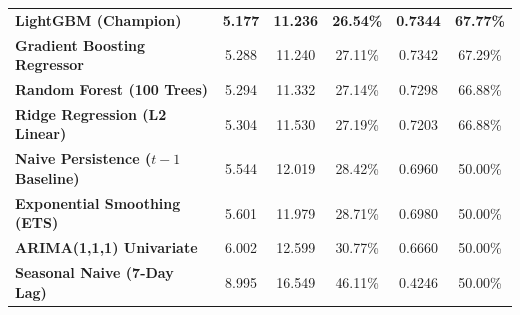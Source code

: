 \documentclass[aspectratio=169, 10pt]{beamer}
\begin{document}
\begin{frame}[t]
\begin{table}[h]
\begin{tabular}{lccccc}
                \textbf{LightGBM (Champion)} & \textbf{5.177} & \textbf{11.236} & \textbf{26.54\%} & \textbf{0.7344} & \textbf{67.77\%} \\                                                             
                \textbf{Gradient Boosting Regressor} & 5.288 & 11.240 & 27.11\% & 0.7342 & 67.29\% \\                                                                                                  
                \textbf{Random Forest (100 Trees)} & 5.294 & 11.332 & 27.14\% & 0.7298 & 66.88\% \\                                                                                                    
                \textbf{Ridge Regression (L2 Linear)} & 5.304 & 11.530 & 27.19\% & 0.7203 & 66.88\% \\                                                                                                 
                \textbf{Naive Persistence ($t-1$ Baseline)} & 5.544 & 12.019 & 28.42\% & 0.6960 & 50.00\% \\                                                                                           
                \textbf{Exponential Smoothing (ETS)} & 5.601 & 11.979 & 28.71\% & 0.6980 & 50.00\% \\                                                                                                  
                \textbf{ARIMA(1,1,1) Univariate} & 6.002 & 12.599 & 30.77\% & 0.6660 & 50.00\% \\                                                                                                      
                \textbf{Seasonal Naive (7-Day Lag)} & 8.995 & 16.549 & 46.11\% & 0.4246 & 50.00\% \\                                                                                                   
                \bottomrule                                                                                                                                                                            
            \end{tabular}                                                                                                                                                                              
        \end{table}                                                                                                                                                                                    

\end{frame}
\end{document}
